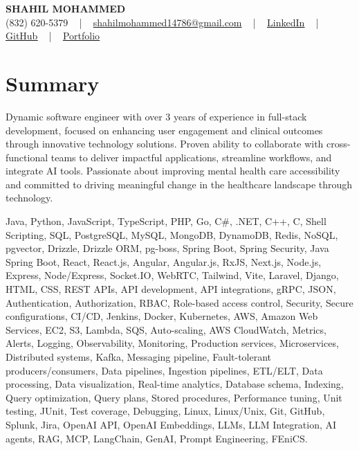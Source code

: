\documentclass[letterpaper,10pt]{article}
\begin{document}
\begin{center}
    {\fontsize{14pt}{12pt}\selectfont \textbf{\MakeUppercase{Shahil Mohammed}}}\\ \vspace{2pt}
    \fontsize{10pt}{12pt}\selectfont (832) 620-5379 ~ | ~ \href{mailto:shahilmohammed14786@gmail.com}{shahilmohammed14786@gmail.com} ~ | ~  
    \href{https://www.linkedin.com/in/shahil-mohammed-9652931a1/}{\color{blue}\underline{LinkedIn}}  ~ | ~ 
    \href{https://github.com/freakbeast14}{\color{blue}\underline{GitHub}} ~ | ~ 
    \href{https://shahil-mohammed.netlify.app/}{\color{blue}\underline{Portfolio}}
    \vspace{-8pt}
\end{center}

\section{Summary}
\vspace{-2pt}\fontsize{8pt}{9pt}\selectfont
Dynamic software engineer with over 3 years of experience in full-stack development, focused on enhancing user engagement and clinical outcomes through innovative technology solutions. Proven ability to collaborate with cross-functional teams to deliver impactful applications, streamline workflows, and integrate AI tools. Passionate about improving mental health care accessibility and committed to driving meaningful change in the healthcare landscape through technology. 
\vspace{-5pt}
 
{\fontsize{1pt}{1pt}\selectfont\color{white}
Java, Python, JavaScript, TypeScript, PHP, Go, C#, .NET, C++, C, Shell Scripting, SQL, PostgreSQL, MySQL, MongoDB, DynamoDB, Redis, NoSQL, pgvector, Drizzle, Drizzle ORM, pg-boss, Spring Boot, Spring Security, Java Spring Boot, React, React.js, Angular, Angular.js, RxJS, Next.js, Node.js, Express, Node/Express, Socket.IO, WebRTC, Tailwind, Vite, Laravel, Django, HTML, CSS, REST APIs, API development, API integrations, gRPC, JSON, Authentication, Authorization, RBAC, Role-based access control, Security, Secure configurations, CI/CD, Jenkins, Docker, Kubernetes, AWS, Amazon Web Services, EC2, S3, Lambda, SQS, Auto-scaling, AWS CloudWatch, Metrics, Alerts, Logging, Observability, Monitoring, Production services, Microservices, Distributed systems, Kafka, Messaging pipeline, Fault-tolerant producers/consumers, Data pipelines, Ingestion pipelines, ETL/ELT, Data processing, Data visualization, Real-time analytics, Database schema, Indexing, Query optimization, Query plans, Stored procedures, Performance tuning, Unit testing, JUnit, Test coverage, Debugging, Linux, Linux/Unix, Git, GitHub, Splunk, Jira, OpenAI API, OpenAI Embeddings, LLMs, LLM Integration, AI agents, RAG, MCP, LangChain, GenAI, Prompt Engineering, FEniCS.
}
\vspace{-8pt}
\end{document}
